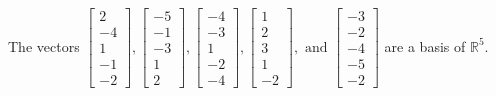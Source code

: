 \begin{exercise}
\begin{exerciseStatement}
  \end{exerciseStatement}
  \begin{exerciseAnswer}
   The vectors \(\left[\begin{array}{r}
2 \\
-4 \\
1 \\
-1 \\
-2
\end{array}\right] , \left[\begin{array}{r}
-5 \\
-1 \\
-3 \\
1 \\
2
\end{array}\right] , \left[\begin{array}{r}
-4 \\
-3 \\
1 \\
-2 \\
-4
\end{array}\right] , \left[\begin{array}{r}
1 \\
2 \\
3 \\
1 \\
-2
\end{array}\right] , \text{ and } \left[\begin{array}{r}
-3 \\
-2 \\
-4 \\
-5 \\
-2
\end{array}\right]\) 
  	 are  a basis of \(\mathbb{R}^5\).
  


  \end{exerciseAnswer}
\end{exercise}